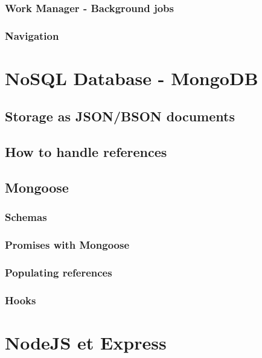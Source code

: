 \documentclass[11pt,a4paper]{report}
\begin{document}
\subsubsection{Work Manager - Background jobs}
\subsubsection{Navigation}

\section{NoSQL Database - MongoDB}
\subsection{Storage as JSON/BSON documents}
\subsection{How to handle references}
\label{mongo_references}
\subsection{Mongoose}

\subsubsection{Schemas}
\subsubsection{Promises with Mongoose}
\subsubsection{Populating references}
\subsubsection{Hooks}
\label{mongoose_hooks}
\section{NodeJS et Express}
\end{document}
